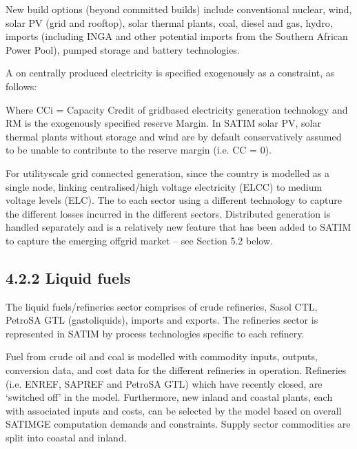 \documentclass[letterpaper,10pt,english]{jupyterBook}
\begin{document}
\sphinxAtStartPar
New build options (beyond committed builds) include conventional nuclear, wind, solar PV (grid and rooftop), solar thermal plants, coal, diesel and gas, hydro, imports (including INGA and other potential imports from the Southern African Power Pool), pumped storage and battery technologies.

\sphinxAtStartPar
A  on centrally produced electricity is specified exogenously as a constraint, as follows:

\sphinxAtStartPar
Where CCi = Capacity Credit of grid\sphinxhyphen{}based electricity generation technology  and RM is the exogenously specified reserve Margin. In SATIM solar PV, solar thermal plants without storage and wind are by default conservatively assumed to be unable to contribute to the reserve margin (i.e. CC = 0).

\sphinxAtStartPar
For utility\sphinxhyphen{}scale grid connected generation, since the country is modelled as a single node,  linking centralised/high voltage electricity (ELCC) to medium voltage levels (ELC). The  to each sector using a different technology to capture the different losses incurred in the different sectors. Distributed generation is handled separately and is a relatively new feature that has been added to SATIM to capture the emerging off\sphinxhyphen{}grid market – see Section 5.2 below.


\subsection{4.2.2 Liquid fuels}
\label{\detokenize{04EnergySupply:liquid-fuels}}
\sphinxAtStartPar
The liquid fuels/refineries sector comprises of crude refineries, Sasol CTL, PetroSA GTL (gas\sphinxhyphen{}to\sphinxhyphen{}liquids), imports and exports. The refineries sector is represented in SATIM by process technologies specific to each refinery.

\sphinxAtStartPar
Fuel from crude oil and coal is modelled with commodity inputs, outputs, conversion data, and cost data for the different refineries in operation. Refineries (i.e. ENREF, SAPREF and PetroSA GTL) which have recently closed, are ‘switched off’ in the model. Furthermore, new inland and coastal plants, each with associated inputs and costs, can be selected by the model based on overall SATIMGE computation demands and constraints. Supply sector commodities are split into coastal and inland.
\end{document}
